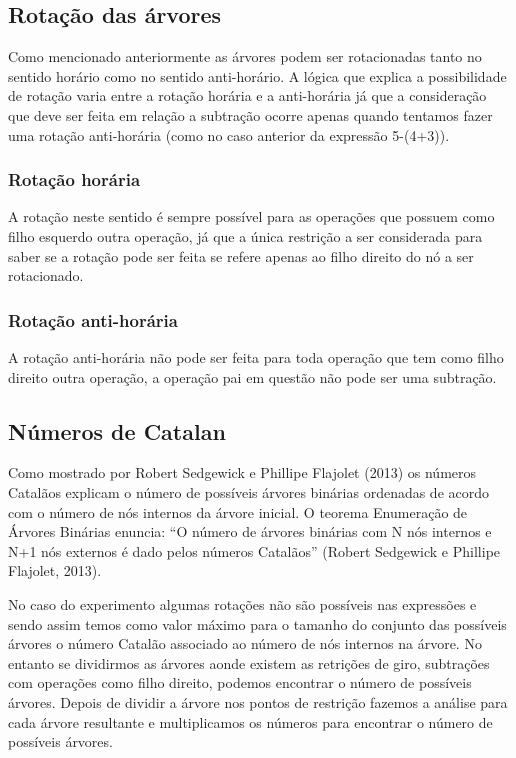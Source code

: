 \subsection{Rotação das árvores}
Como mencionado anteriormente as árvores podem ser rotacionadas tanto no sentido horário como no sentido anti-horário. A lógica que explica a possibilidade de rotação varia entre a rotação horária e a anti-horária já que a consideração que deve ser feita em relação a subtração ocorre apenas quando tentamos fazer uma rotação anti-horária (como no caso anterior da expressão 5-(4+3)).

\subsubsection{Rotação horária}
	A rotação neste sentido é sempre possível para as operações que possuem como filho esquerdo outra operação, já que a única restrição a ser considerada para saber se a rotação pode ser feita se refere apenas ao filho direito do nó a ser rotacionado.
	
\subsubsection{Rotação anti-horária}
	A rotação anti-horária não pode ser feita para toda operação que tem como filho direito outra operação, a operação pai em questão não pode ser uma subtração.
	
\subsection{Números de Catalan}
Como mostrado por Robert Sedgewick e Phillipe Flajolet (2013) os números Catalãos explicam o número de possíveis árvores binárias ordenadas de acordo com o número de nós internos da árvore inicial. O teorema Enumeração de Árvores Binárias enuncia: “O número de árvores binárias com N nós internos e N+1 nós externos é dado pelos números Catalãos” (Robert Sedgewick e Phillipe Flajolet, 2013).

	No caso do experimento algumas rotações não são possíveis nas expressões e sendo assim temos como valor máximo para o tamanho do conjunto das possíveis árvores o número Catalão associado ao número de nós internos na árvore. No entanto se dividirmos as árvores aonde existem as retrições de giro, subtrações com operações como filho direito, podemos encontrar o número de possíveis árvores. Depois de dividir a árvore nos pontos de restrição fazemos a análise para cada árvore resultante e multiplicamos os números para encontrar o número de possíveis árvores.
	
